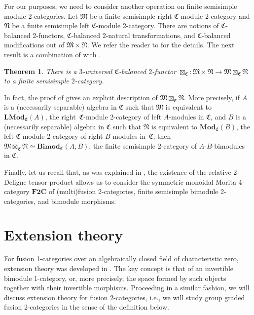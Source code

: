 \documentclass[11pt]{article}
\numberwithin{equation}{section}
\newtheorem{Theorem}{Theorem}[section]
\numberwithin{equation}{section}
\begin{document}
For our purposes, we need to consider another operation on finite semisimple module 2-categories. Let $\mathfrak{M}$ be a finite semisimple right $\mathfrak{C}$-module 2-category and $\mathfrak{N}$ be a finite semisimple left $\mathfrak{C}$-module 2-category. There are notions of $\mathfrak{C}$-balanced 2-functors, $\mathfrak{C}$-balanced 2-natural transformations, and $\mathfrak{C}$-balanced modifications out of $\mathfrak{M}\times\mathfrak{N}$. We refer the reader to \cite[Section~2.2]{D10} for the details. The next result is a combination of \cite[Theorem~2.2.4]{D10} with \cite[Corollary~5.1.3]{D9}.

\begin{Theorem}
There is a $3$-universal $\mathfrak{C}$-balanced $2$-functor $\boxtimes_{\mathfrak{C}}\colon \mathfrak{M}\times\mathfrak{N}\rightarrow \mathfrak{M}\boxtimes_{\mathfrak{C}}\mathfrak{N}$ to a finite semisimple $2$-category.
\end{Theorem}

In fact, the proof of \cite[Theorem~2.2.4]{D10} gives an explicit description of $\mathfrak{M}\boxtimes_{\mathfrak{C}}\mathfrak{N}$. More precisely, if $A$ is a (necessarily separable) algebra in $\mathfrak{C}$ such that $\mathfrak{M}$ is equivalent to $\mathbf{LMod}_{\mathfrak{C}}(A)$, the right~$\mathfrak{C}$-module 2-category of left $A$-modules in $\mathfrak{C}$, and $B$ is a (necessarily separable) algebra in $\mathfrak{C}$ such that $\mathfrak{N}$ is equivalent to $\mathbf{Mod}_{\mathfrak{C}}(B)$, the left $\mathfrak{C}$-module 2-category of right $B$-modules in~$\mathfrak{C}$, then~$\mathfrak{M}\boxtimes_{\mathfrak{C}}\mathfrak{N}\simeq \mathbf{Bimod}_{\mathfrak{C}}(A,B)$, the finite semisimple 2-category of $A$-$B$-bimodules in $\mathfrak{C}$.

Finally, let us recall that, as was explained in \cite[Section~3.2]{D10}, the existence of the relative 2-Deligne tensor product allows us to consider the symmetric monoidal Morita 4-category $\mathbf{F2C}$ of (multi)fusion 2-categories, finite semisimple bimodule 2-categories, and bimodule morphisms.

\section{Extension theory}

For fusion 1-categories over an algebraically closed field of characteristic zero, extension theory was developed in \cite{ENO2}. The key concept is that of an invertible bimodule 1-category, or, more precisely, the space formed by such objects together with their invertible morphisms. Proceeding in a similar fashion, we will discuss extension theory for fusion 2-categories, i.e., we will study group graded fusion 2-categories in the sense of the definition below.
\end{document}

